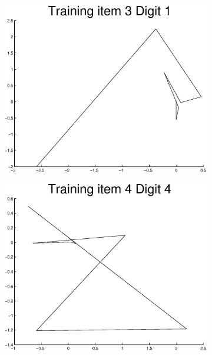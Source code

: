 \documentclass{article}
\begin{document}
	\begin{figure}[H]
	  \begin{subfigure}
	    \centering
	    \includegraphics[scale=0.4]{task1-transformed-digit-3.eps}
	  \end{subfigure}
	  \begin{subfigure}
	    \centering
	    \includegraphics[scale=0.4]{task1-transformed-digit-4.eps}
	  \end{subfigure}
	\end{figure}
\end{document}
